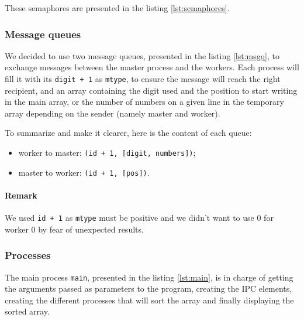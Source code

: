 \documentclass[a4paper, 12pt]{article}
\begin{document}
	These semaphores are presented in the listing \ref{lst:semaphores}.\par
	
	
	
	\subsubsection{Message queues}
	We decided to use two message queues, presented in the listing \ref{lst:msgq}, to exchange messages between the master process and the workers. Each process will fill it with its \texttt{digit + 1} as \texttt{mtype}, to ensure the message will reach the right recipient, and an array containing the digit used and the position to start writing in the main array, or the number of numbers on a given line in the temporary array depending on the sender (namely master and worker).\par
	
	To summarize and make it clearer, here is the content of each queue: 
	
	\begin{itemize}
	    \item worker to master: \texttt{(id + 1, [digit, numbers])};
	    \item master to worker: \texttt{(id + 1, [pos])}.
	\end{itemize}
	
	\paragraph{Remark} We used \texttt{id + 1} as \texttt{mtype} must be positive and we didn't want to use 0 for worker 0 by fear of unexpected results.\par
	
	
	
	\subsubsection{Processes}
	The main process \texttt{main}, presented in the listing \ref{lst:main}, is in charge of getting the arguments passed as parameters to the program, creating the IPC elements, creating the different processes that will sort the array and finally displaying the sorted array.\par
	
\end{document}
